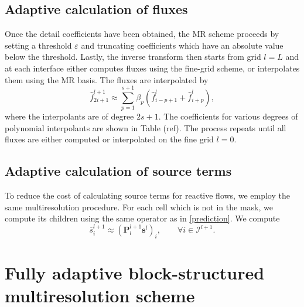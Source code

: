 \documentclass[]{article}
\begin{document}
    \subsection{Adaptive calculation of fluxes}

        Once the detail coefficients have been obtained, the MR scheme
        proceeds by setting a threshold $\varepsilon$ and truncating coefficients
        which have an absolute value below the threshold. Lastly, the inverse
        transform then starts from grid $l=L$ and at each interface either
        computes fluxes using the fine-grid scheme, or interpolates them using
        the MR basis. The fluxes are interpolated by
        \begin{equation}
            \hat{f}_{2i+1}^{l+1} \approx \sum_{p=1}^{s+1} \beta_{p} \left(
            \hat{f}^{l}_{i-p+1} + \hat{f}^{l}_{i+p} \right),
        \end{equation}
        where the interpolants are of degree $2s+1$. The coefficients for
        various degrees of polynomial interpolants are shown in Table (ref).
        The process repeats until all fluxes are either computed or
        interpolated on the fine grid $l=0$.

    \subsection{Adaptive calculation of source terms}

        To reduce the cost of calculating source terms for reactive flows, we employ
        the same multiresolution procedure. For each cell which is not in the mask,
        we compute its children using the same operator as in \ref{prediction}.
        We compute
        \begin{equation}
            \overline{s}_{i}^{l+1} \approx \left( \bm{P}_{l}^{l+1} \bm{s}^{l}
                \right)_{i}, \text{ } \text{ } \text{ } \forall i \in
                \bm{\mathcal{I}}^{l+1}.
        \end{equation}

\section{Fully adaptive block-structured multiresolution scheme}

\end{document}
